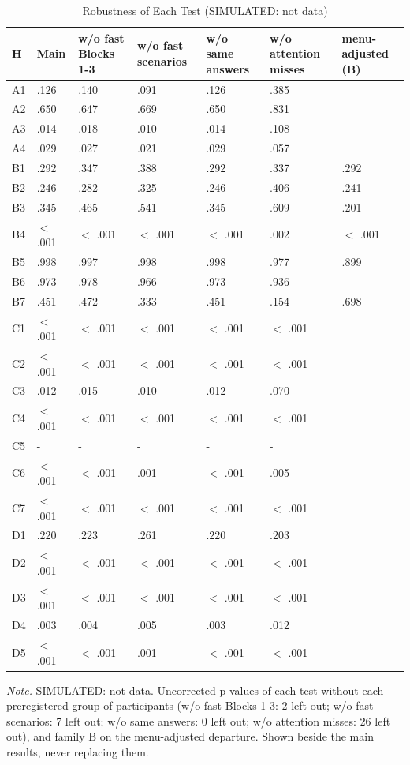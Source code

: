 \begin{table}[htbp]
\centering
\begin{threeparttable}
\caption{Robustness of Each Test (SIMULATED: not data)}
\label{tab:robustness}
\footnotesize
\begin{tabular}{lllllll}
\toprule
H & Main & w/o fast Blocks 1-3 & w/o fast scenarios & w/o same answers & w/o attention misses & menu-adjusted (B) \\
\midrule
A1 & .126 & .140 & .091 & .126 & .385 &  \\
A2 & .650 & .647 & .669 & .650 & .831 &  \\
A3 & .014 & .018 & .010 & .014 & .108 &  \\
A4 & .029 & .027 & .021 & .029 & .057 &  \\
B1 & .292 & .347 & .388 & .292 & .337 & .292 \\
B2 & .246 & .282 & .325 & .246 & .406 & .241 \\
B3 & .345 & .465 & .541 & .345 & .609 & .201 \\
B4 & $<$ .001 & $<$ .001 & $<$ .001 & $<$ .001 & .002 & $<$ .001 \\
B5 & .998 & .997 & .998 & .998 & .977 & .899 \\
B6 & .973 & .978 & .966 & .973 & .936 &  \\
B7 & .451 & .472 & .333 & .451 & .154 & .698 \\
C1 & $<$ .001 & $<$ .001 & $<$ .001 & $<$ .001 & $<$ .001 &  \\
C2 & $<$ .001 & $<$ .001 & $<$ .001 & $<$ .001 & $<$ .001 &  \\
C3 & .012 & .015 & .010 & .012 & .070 &  \\
C4 & $<$ .001 & $<$ .001 & $<$ .001 & $<$ .001 & $<$ .001 &  \\
C5 & - & - & - & - & - &  \\
C6 & $<$ .001 & $<$ .001 & .001 & $<$ .001 & .005 &  \\
C7 & $<$ .001 & $<$ .001 & $<$ .001 & $<$ .001 & $<$ .001 &  \\
D1 & .220 & .223 & .261 & .220 & .203 &  \\
D2 & $<$ .001 & $<$ .001 & $<$ .001 & $<$ .001 & $<$ .001 &  \\
D3 & $<$ .001 & $<$ .001 & $<$ .001 & $<$ .001 & $<$ .001 &  \\
D4 & .003 & .004 & .005 & .003 & .012 &  \\
D5 & $<$ .001 & $<$ .001 & .001 & $<$ .001 & $<$ .001 &  \\
\bottomrule
\end{tabular}
\begin{tablenotes}[flushleft]
\footnotesize
\item \textit{Note.} SIMULATED: not data. Uncorrected p-values of each test without each preregistered group of participants (w/o fast Blocks 1-3: 2 left out; w/o fast scenarios: 7 left out; w/o same answers: 0 left out; w/o attention misses: 26 left out), and family B on the menu-adjusted departure. Shown beside the main results, never replacing them.
\end{tablenotes}
\end{threeparttable}
\end{table}
